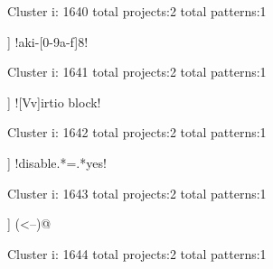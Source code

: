 Cluster i: 1640
total projects:2
total patterns:1
\begin{multicols}{1}
\begin{description}[noitemsep,topsep=0pt]
\item [[2] ] \cverb!aki-[0-9a-f]{8}!
\end{description}
\end{multicols}







Cluster i: 1641
total projects:2
total patterns:1
\begin{multicols}{1}
\begin{description}[noitemsep,topsep=0pt]
\item [[2] ] \cverb![Vv]irtio block!
\end{description}
\end{multicols}







Cluster i: 1642
total projects:2
total patterns:1
\begin{multicols}{1}
\begin{description}[noitemsep,topsep=0pt]
\item [[2] ] \cverb!disable.*=.*yes!
\end{description}
\end{multicols}







Cluster i: 1643
total projects:2
total patterns:1
\begin{multicols}{1}
\begin{description}[noitemsep,topsep=0pt]
\item [[2] ] \cverb@(\n\s*<\!--)@
\end{description}
\end{multicols}







Cluster i: 1644
total projects:2
total patterns:1
\begin{multicols}{1}
\end{multicols}







